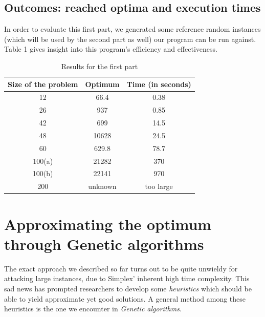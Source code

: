 \documentclass[letterpaper, 10 pt, conference]{ieeeconf}  %
\begin{document}
\subsection{Outcomes: reached optima and execution times}
In order to evaluate this first part, we generated some reference random instances (which will be used by the second part as well) our program can be run against. \newline Table 1  gives insight into this program's efficiency and effectiveness.
\begin{table}[h]
\caption{Results for the first part}
\label{table_example}
\begin{center}
\begin{tabular}{|c|c|c|}
\hline
\textbf{Size of the problem} & \textbf{Optimum} & \textbf{Time (in seconds)} \\
\hline
12 &  66.4 &  0.38\\
\hline
26 & 937 & 0.85 \\
\hline
42 & 699 & 14.5\\
\hline
48 & 10628 & 24.5 \\
\hline
60 & 629.8 & 78.7 \\
\hline
100(a) & 21282 & 370 \\
\hline
100(b) & 22141 & 970 \\
\hline
200 & unknown & too large\\
\hline
\end{tabular}
\end{center}
\end{table}

\section{Approximating the optimum through Genetic algorithms}
The exact approach we described so far turns out to be quite unwieldy for attacking large instances, due to Simplex' inherent high time complexity.  
This sad news has prompted researchers to develop some \textit{heuristics} 
which should be able to yield approximate yet good solutions. A general method among these heuristics is the one we encounter in \textit{Genetic algorithms}.
\end{document}
